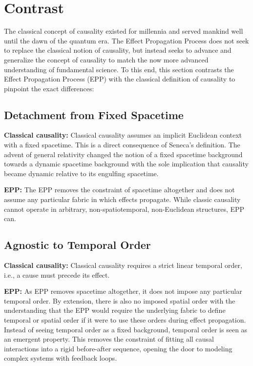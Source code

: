 \section{Contrast}
\label{sec:contrast}

The classical concept of causality existed for millennia and served mankind well until the dawn of the quantum era. The Effect Propagation Process does not seek to replace the classical notion of causality, but instead seeks to advance and generalize the concept of causality to match the now more advanced understanding of fundamental science. To this end, this section contrasts the Effect Propagation Process (EPP) with the classical definition of causality to pinpoint the exact differences:

\subsection{Detachment from Fixed Spacetime}

\textbf{Classical causality:} 
Classical causality assumes an implicit Euclidean context with a fixed spacetime. This is a direct consequence of Seneca’s definition. The advent of general relativity changed the notion of a fixed spacetime background towards a dynamic spacetime background with the sole implication that causality became dynamic relative to its engulfing spacetime.

\textbf{EPP:} 
The EPP removes the constraint of spacetime altogether and does not assume any particular fabric in which effects propagate. While classic causality cannot operate in arbitrary, non-spatiotemporal, non-Euclidean structures, EPP  can.


\subsection{Agnostic to Temporal Order}

\textbf{Classical causality:} 
Classical causality requires a strict linear temporal order, i.e., a cause must precede its effect.

\textbf{EPP:} 
 As EPP removes spacetime altogether, it does not impose any particular temporal order. By extension, there is also no imposed spatial order with the understanding that the EPP would require the underlying fabric to define temporal or spatial order if it were to use these orders during effect propagation.
Instead of seeing temporal order as a fixed background, temporal order is seen as an emergent property. This removes the constraint of fitting all causal interactions into a rigid before-after sequence, opening the door to modeling complex systems with feedback loops.

